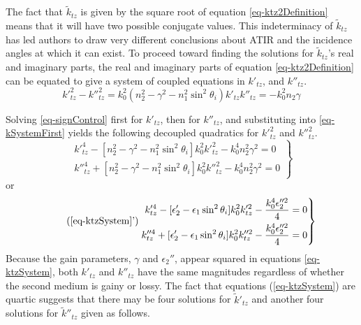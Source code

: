 \documentclass[12pt]{uthesis-v12}
\begin{document}
The fact that $\tilde{k}_{tz}$ is given by the  square root of equation \ref{eq-ktz2Definition} means that it will have two possible conjugate values.  This indeterminacy of $\tilde{k}_{tz}$ has led authors to draw very different conclusions about ATIR and the incidence angles at which it can exist. To proceed toward finding the solutions for $\tilde{k}_{tz}$'s real and imaginary parts, the real and imaginary parts of equation \ref{eq-ktz2Definition} can be equated to give a system of coupled equations in $k'_{tz}$, and $k''_{tz}$.
\begin{subequations}
\begin{equation}\label{eq-kSystemFirst}
k'^2_{tz}-k''^2_{tz}=k_0^2(n_2^2-\gamma^2-n_1^2\sin^2\theta_i)
\end{equation}
\begin{equation}\label{eq-signControl}
k'_{tz}k''_{tz}=-k_0^2n_2\gamma
\end{equation}
\end{subequations}

Solving \ref{eq-signControl} first for $k'_{tz}$, then for $k''_{tz}$, and substituting into \ref{eq-kSystemFirst} yields the following decoupled quadratics for $k'^2_{tz}$ and $k''^2_{tz}$.
\begin{equation}\label{eq-ktzSystem}
\left.
\begin{aligned}
k'^4_{tz}  - [n_2^2-\gamma^2-n_1^2\sin^2\theta_i]k_0^2k'^2_{tz}  - k_0^4n_2^2\gamma^2 = 0 \\
k''^4_{tz} + [n_2^2-\gamma^2-n_1^2\sin^2\theta_i]k_0^2k''^2_{tz} - k_0^4n_2^2\gamma^2 = 0
\end{aligned}
\right\}
\end{equation}
or
\begin{equation}\label{eq-ktzSystemEpsilon}
\tag{\ref{eq-ktzSystem}'}
\left.
\begin{aligned}
k'^4_{tz}  - [\epsilon_2'-\epsilon_1\sin^2\theta_i]k_0^2k'^2_{tz}  - \frac{k_0^4\epsilon_2''^2}{4} = 0 \\
k''^4_{tz} + [\epsilon_2'-\epsilon_1\sin^2\theta_i]k_0^2k''^2_{tz} - \frac{k_0^4\epsilon_2''^2}{4} = 0
\end{aligned}
\right\}
\end{equation}
Because the gain parameters, $\gamma$ and $\epsilon_2''$, appear squared in equations \ref{eq-ktzSystem}, both $k'_{tz}$ and $k''_{tz}$ have the same magnitudes regardless of whether the second medium is gainy or lossy. The fact that equations (\ref{eq-ktzSystem}) are quartic suggests that there may be four solutions for $\tilde{k}'_{tz}$ and another four solutions for $\tilde{k}''_{tz}$ given as follows.
\end{document}
